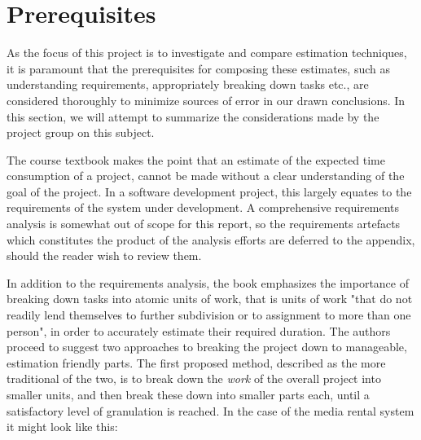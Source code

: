 \section{Prerequisites}
As the focus of this project is to investigate and compare estimation techniques, it is paramount that the prerequisites for composing these estimates, such as understanding requirements, appropriately breaking down tasks etc., are considered thoroughly to minimize sources of error in our drawn conclusions. In this section, we will attempt to summarize the considerations made by the project group on this subject.

The course textbook makes the point that an estimate of the expected time consumption of a project, cannot be made without a clear understanding of the goal of the project. In a software development project, this largely equates to the requirements of the system under development. A comprehensive requirements analysis is somewhat out of scope for this report, so the requirements artefacts which constitutes the product of the analysis efforts are deferred to the appendix, should the reader wish to review them.

In addition to the requirements analysis, the book emphasizes the importance of breaking down tasks into atomic units of work, that is units of work "that do not readily lend themselves to further subdivision or to assignment to more than one person", in order to accurately estimate their required duration. The authors proceed to suggest two approaches to breaking the project down to manageable, estimation friendly parts. The first proposed method, described as the more traditional of the two, is to break down the \textit{work} of the overall project into smaller units, and then break these down into smaller parts each, until a satisfactory level of granulation is reached. In the case of the media rental system it might look like this:

